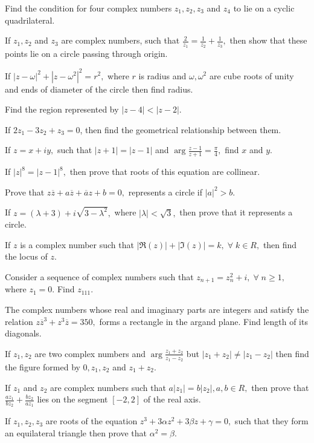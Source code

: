 \item Find the condition for four complex numbers $z_1, z_2, z_3$ and $z_4$ to lie on a cyclic quadrilateral.
\item If $z_1, z_2$ and $z_3$ are complex numbers, such that $\frac{2}{z_1} = \frac{1}{z_2} + \frac{1}{z_3},$ then show
  that these points lie on a circle passing through origin.
\item If $|z - \omega|^2 + |z - \omega^2|^2 = r^2,$ where $r$ is radius and $\omega, \omega^2$ are cube roots of unity
  and ends of diameter of the circle then find radius.
\item Find the region represented by $|z - 4| < |z - 2|$.
\item If $2z_1 - 3z_2 + z_3 = 0$, then find the geometrical relationship between them.
\item If $z = x + iy,$ such that $|z + 1| = |z - 1|$ and $\arg\frac{z - 1}{z + 1} = \frac{\pi}{4},$ find $x$ and $y$.
\item If $|z|^8 = |z - 1|^8,$ then prove that roots of this equation are collinear.
\item Prove that $z\overline{z} + a\overline{z} + \overline{a}z + b = 0,$ represents a circle if $|a|^2 > b$.
\item If $z = (\lambda + 3) + i\sqrt{3 - \lambda^2},$ where $|\lambda| < \sqrt{3},$ then prove that it represents a circle.
\item If $z$ is a complex number such that $|\Re(z)| + |\Im(z)| = k,\;\forall\; k\in R,$ then find the locus of $z$.
\item Consider a sequence of complex numbers such that $z_{n + 1} = z_n^2 + i,\;\forall\;n\geq 1,$ where $z_1 = 0.$ Find $z_{111}$.
\item The complex numbers whose real and imaginary parts are integers and satisfy the relation $z\overline{z}^3 +
  z^3\overline{z} = 350,$ forms a rectangle in the argand plane. Find length of its diagonals.
\item If $z_1, z_2$ are two complex numbers and $\arg\frac{z_1 + z_2}{z_1 - z_2}$ but $|z_1 + z_2|\neq |z_1 - z_2|$ then
  find the figure formed by $0, z_1, z_2$ and $z_1 + z_2.$
\item If $z_1$ and $z_2$ are complex numbers such that $a|z_1| = b|z_2|, a, b\in R,$ then prove that $\frac{az_1}{bz_2} +
  \frac{bz_2}{az_1}$ lies on the segment $[-2, 2]$ of the real axis.
\item If $z_1, z_2, z_3$ are roots of the equation $z^3 + 3\alpha z^2 + 3\beta z + \gamma = 0,$ such that they form an
  equilateral triangle then prove that $\alpha^2 = \beta$.
